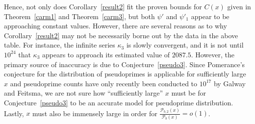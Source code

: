 \documentclass[11pt]{article}
\theoremstyle{plain}
\theoremstyle{definition}
\theoremstyle{remark}
\numberwithin{equation}{subsection}
\begin{document}
Hence, not only does Corollary~\ref{result2} fit the proven bounds for $C(x)$ given in Theorem~\ref{carm1} and Theorem~\ref{carm3}, but both $\psi'$ and $\psi'_1$ appear to be approaching constant values. However, there are several reasons as to why Corollary~\ref{result2} may not be necessarily borne out by the data in the above table. For instance, the infinite series $\kappa_3$ is slowly convergent, and it is not until $10^{24}$ that $\kappa_3$ appears to approach its estimated value of $2087.5$. However, the primary source of inaccuracy is due to Conjecture~\ref{pseudo3}. Since Pomerance's conjecture for the distribution of pseudoprimes is applicable for sufficiently large $x$ and pseudoprime counts have only recently been conducted to $10^{17}$ by Galway and Feitsma, we are not sure how ``sufficiently large'' $x$ must be for Conjecture~\ref{pseudo3} to be an accurate model for pseudoprime distribution. Lastly, $x$ must also be immensely large in order for $\frac{\mathscr{P}_{b,2}(x)}{\mathscr{P}_b(x)} = o(1)$.
\end{document}
